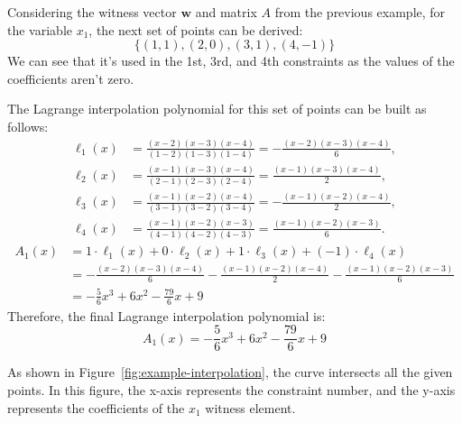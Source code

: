 \documentclass[../lecture-notes.tex]{subfiles}
\begin{document}
\begin{example}
    Considering the witness vector $\mathbf{w}$ and matrix $A$ from the previous example, for the variable
    $x_1$, the next set of points can be derived:
    \begin{equation*}
        \{(1,1), (2,0), (3,1), (4,-1)\}
    \end{equation*}
    We can see that it's used in the 1st, 3rd, and 4th constraints as the values of the coefficients
    aren't zero.
    
    The Lagrange interpolation polynomial for this set of points can be built as follows:
    \begin{align*}
        \ell_1(x) &= \frac{(x - 2)(x - 3)(x - 4)}{(1 - 2)(1 - 3)(1 - 4)} = -\frac{(x - 2)(x - 3)(x - 4)}{6}, \\
        \ell_2(x) &= \frac{(x - 1)(x - 3)(x - 4)}{(2 - 1)(2 - 3)(2 - 4)} = \frac{(x - 1)(x - 3)(x - 4)}{2}, \\
        \ell_3(x) &= \frac{(x - 1)(x - 2)(x - 4)}{(3 - 1)(3 - 2)(3 - 4)} = -\frac{(x - 1)(x - 2)(x - 4)}{2}, \\
        \ell_4(x) &= \frac{(x - 1)(x - 2)(x - 3)}{(4 - 1)(4 - 2)(4 - 3)} = \frac{(x - 1)(x - 2)(x - 3)}{6}.
    \end{align*}
    \begin{align*}
        A_1(x) &= 1 \cdot \ell_1(x) + 0 \cdot \ell_2(x) + 1 \cdot \ell_3(x) + (-1) \cdot \ell_4(x) \\
        &= -\frac{(x - 2)(x - 3)(x - 4)}{6} - \frac{(x - 1)(x - 2)(x - 4)}{2} - \frac{(x - 1)(x - 2)(x - 3)}{6} \\
        &= -\frac{5}{6}x^3 + 6x^2 - \frac{79}{6}x + 9
    \end{align*}
    Therefore, the final Lagrange interpolation polynomial is:
    \begin{equation*}
        A_1(x) = -\frac{5}{6}x^3 + 6x^2 - \frac{79}{6}x + 9
    \end{equation*}

    As shown in Figure~\ref{fig:example-interpolation}, the curve intersects all the given points.
    In this figure, the x-axis represents the constraint number, and the y-axis represents the 
    coefficients of the $x_1$ witness element.
\end{example}
\end{document}
